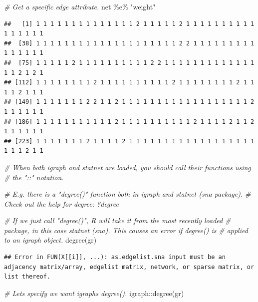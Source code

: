\documentclass[
]{book}
\newenvironment{Shaded}{\begin{snugshade}}{\end{snugshade}}
\newcommand{\CommentTok}[1]{\textcolor[rgb]{0.56,0.35,0.01}{\textit{#1}}}
\newcommand{\FunctionTok}[1]{\textcolor[rgb]{0.00,0.00,0.00}{#1}}
\newcommand{\NormalTok}[1]{#1}
\newcommand{\SpecialCharTok}[1]{\textcolor[rgb]{0.00,0.00,0.00}{#1}}
\newcommand{\StringTok}[1]{\textcolor[rgb]{0.31,0.60,0.02}{#1}}
\begin{document}
\begin{Shaded}
\begin{Highlighting}[]
\CommentTok{\# Get a specific edge attribute.}
\NormalTok{net }\SpecialCharTok{\%e\%} \StringTok{"weight"}
\end{Highlighting}
\end{Shaded}

\begin{verbatim}
##   [1] 1 1 1 1 1 1 1 1 1 1 1 1 1 1 2 1 1 1 1 1 2 1 1 1 1 1 1 1 1 1 1 1 1 1 1 1 1
##  [38] 1 1 1 1 1 1 1 1 1 1 1 1 1 1 1 1 1 1 1 1 2 2 1 1 1 1 1 1 1 1 1 1 1 1 1 1 1
##  [75] 1 1 1 1 1 2 1 1 1 1 1 1 1 1 1 1 2 2 1 1 1 1 1 1 1 1 1 1 1 1 1 1 1 2 1 2 1
## [112] 1 1 1 1 1 1 1 1 2 1 1 1 1 1 1 1 1 1 1 2 1 1 1 1 1 1 1 1 2 1 1 1 1 2 1 1 1
## [149] 1 1 1 1 1 1 1 2 2 1 1 2 1 1 1 1 1 1 1 1 1 1 1 1 1 1 1 1 1 1 2 1 1 1 1 1 1
## [186] 1 1 1 1 1 1 1 1 1 1 1 2 1 1 1 1 1 1 1 1 1 1 2 1 1 1 1 2 1 1 2 1 1 1 1 1 1
## [223] 1 1 1 1 1 1 1 2 1 1 1 1 2 1 1 1 1 1 1 1 1 1 1 1 1 1 1 1 1 1 1 1 1 1 2 1 1
\end{verbatim}

\begin{Shaded}
\begin{Highlighting}[]
\CommentTok{\# When both igraph and statnet are loaded, you should call their functions using}
\CommentTok{\# the "::" notation.}

\CommentTok{\# E.g. there is a "degree()" function both in igraph and statnet (sna package).}
\CommentTok{\# Check out the help for degree: ?degree}

\CommentTok{\# If we just call "degree()", R will take it from the most recently loaded }
\CommentTok{\# package, in this case statnet (sna). This causes an error if degree() is}
\CommentTok{\# applied to an igraph object.}
\FunctionTok{degree}\NormalTok{(gr)}
\end{Highlighting}
\end{Shaded}

\begin{verbatim}
## Error in FUN(X[[i]], ...): as.edgelist.sna input must be an adjacency matrix/array, edgelist matrix, network, or sparse matrix, or list thereof.
\end{verbatim}

\begin{Shaded}
\begin{Highlighting}[]
\CommentTok{\# Let\textquotesingle{}s specify we want igraph\textquotesingle{}s degree().}
\NormalTok{igraph}\SpecialCharTok{::}\FunctionTok{degree}\NormalTok{(gr)}
\end{Highlighting}
\end{Shaded}
\end{document}
